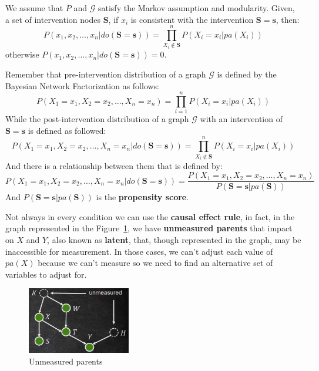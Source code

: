 \begin{definition}
      We assume that $P$ and $\mathcal{G}$ satisfy the Markov assumption and modularity.
      Given, a set of intervention nodes $\mathbf{S}$, if $x_i$ is consistent
      with the intervention $\mathbf{S} = \mathbf{s}$, then:
      \begin{equation}
            P(x_1, x_2, \dots, x_n| do(\mathbf{S} = \mathbf{s})) = \prod_{X_i \not \in \mathbf{S}}^{n} P(X_i = x_i | pa(X_i))
      \end{equation}
      otherwise $P(x_1, x_2, \dots, x_n| do(\mathbf{S} = \mathbf{s})) = 0$.
\end{definition}

\begin{note}
      Remember that pre-intervention distribution of a graph $\mathcal{G}$ is
      defined by the Bayesian Network Factorization as follows:
      \begin{equation*}
            P(X_1 = x_1, X_2 = x_2, \dots, X_n = x_n) = \prod_{i = 1}^{n} P(X_i = x_i | pa(X_i))
      \end{equation*}
      While the post-intervention distribution of a graph $\mathcal{G}$ with an
      intervention of $\mathbf{S} = \mathbf{s}$ is defined as followed:
      \begin{equation*}
            P(X_1 = x_1, X_2 = x_2, \dots, X_n = x_n | do(\mathbf{S} = \mathbf{s})) = \prod_{X_i \not \in \mathbf{S}}^{n} P(X_i = x_i | pa(X_i))
      \end{equation*}
      And there is a relationship between them that is defined by:
      \begin{equation*}
            P(X_1 = x_1, X_2 = x_2, \dots, X_n = x_n | do(\mathbf{S} = \mathbf{s})) = \frac{P(X_1 = x_1, X_2 = x_2, \dots, X_n = x_n)}{P(\mathbf{S} = \mathbf{s} | pa(\mathbf{S}))}
      \end{equation*}
      And $P(\mathbf{S} = \mathbf{s} | pa(\mathbf{S}))$ is the \textbf{propensity score}.
\end{note}

Not always in every condition we can use the \textbf{causal effect rule}, in fact,
in the graph represented in the Figure~\ref{fig:unmeasured_parents}, we have
\textbf{unmeasured parents} that impact on $X$ and $Y$, also known as \textbf{latent},
that, though represented in the graph, may be inaccessible for measurement. In
those cases, we can't adjust each value of $pa(X)$ because we can't measure
so we need to find an alternative set of variables to adjust for.
\begin{figure}[!ht]
      \centering
      \includegraphics[width=0.4\textwidth]{img/causal_models/unmeasured_parents.png}
      \caption{Unmeasured parents}
      \label{fig:unmeasured_parents}
\end{figure}

